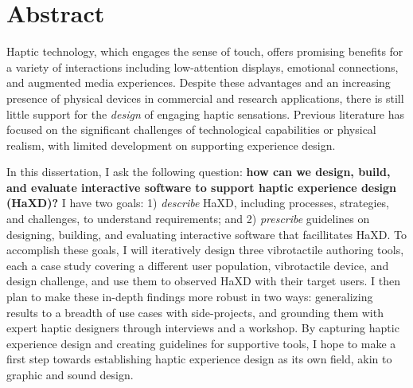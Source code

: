 
\chapter{Abstract}

Haptic technology, which engages the sense of touch, offers promising benefits for a variety of interactions including low-attention displays, emotional connections, and augmented media experiences.
Despite these advantages and an increasing presence of physical devices in commercial and research applications, there is still little support for the \emph{design} of engaging haptic sensations.
Previous literature has focused on the significant challenges of technological capabilities or physical realism, with limited development on supporting experience design. %

In this dissertation, I ask the following question: \textbf{how can we design, build, and evaluate interactive software to support haptic experience design (HaXD)?}
I have two goals: 1) \emph{describe} HaXD, including processes, strategies, and challenges, to understand requirements; and 2) \emph{prescribe} guidelines on designing, building, and evaluating interactive software that facillitates HaXD.
To accomplish these goals, I will iteratively design three vibrotactile authoring tools, each a case study covering a different user population, vibrotactile device, and design challenge, and use them to observed HaXD with their target users.
I then plan to make these in-depth findings more robust in two ways: generalizing results to a breadth of use cases with side-projects, and grounding them with expert haptic designers through interviews and a workshop.
By capturing haptic experience design and creating guidelines for supportive tools, I hope to make a first step towards establishing haptic experience design as its own field, akin to graphic and sound design.


\vfill
\begin{center}
\begin{sf}
\end{sf}
\end{center}
